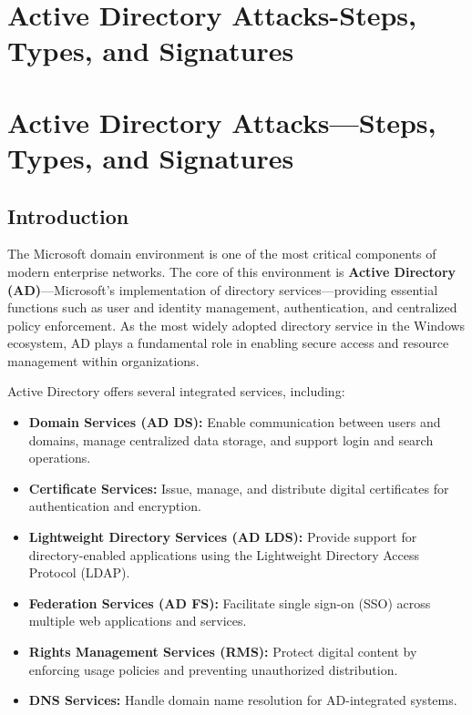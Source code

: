 \chapter{Active Directory Attacks-Steps, Types, and Signatures}

\chapter{Active Directory Attacks—Steps, Types, and Signatures}

\section{Introduction}

The Microsoft domain environment is one of the most critical components of modern enterprise networks. The core of this environment is \textbf{Active Directory (AD)}—Microsoft’s implementation of directory services—providing essential functions such as user and identity management, authentication, and centralized policy enforcement. As the most widely adopted directory service in the Windows ecosystem, AD plays a fundamental role in enabling secure access and resource management within organizations.

Active Directory offers several integrated services, including:

\begin{itemize}
    \item \textbf{Domain Services (AD DS):} Enable communication between users and domains, manage centralized data storage, and support login and search operations.
    \item \textbf{Certificate Services:} Issue, manage, and distribute digital certificates for authentication and encryption.
    \item \textbf{Lightweight Directory Services (AD LDS):} Provide support for directory-enabled applications using the Lightweight Directory Access Protocol (LDAP).
    \item \textbf{Federation Services (AD FS):} Facilitate single sign-on (SSO) across multiple web applications and services.
    \item \textbf{Rights Management Services (RMS):} Protect digital content by enforcing usage policies and preventing unauthorized distribution.
    \item \textbf{DNS Services:} Handle domain name resolution for AD-integrated systems.
\end{itemize}

